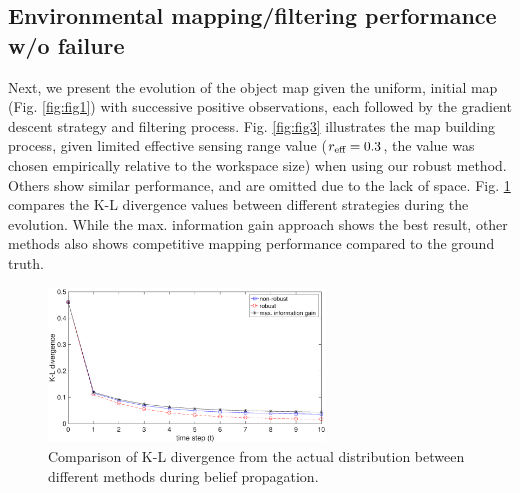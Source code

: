 \documentclass[letterpaper, 10 pt, conference]{ieeeconf}
\begin{document}
\subsection{Environmental mapping/filtering performance w/o failure}
Next, we present the evolution of the object map given the uniform, initial map (Fig. \ref{fig:fig1}) with successive positive observations, each followed by the gradient descent strategy and filtering process. Fig. \ref{fig:fig3} illustrates the map building process, given limited effective sensing range value ($r_{\textup{eff}}=0.3$, the value was chosen empirically relative to the workspace size) when using our robust method. Others show similar performance, and are omitted due to the lack of space.
%
%
Fig. \ref{fig:fig5} compares the K-L divergence values between different strategies during the evolution. While the max. information gain approach shows the best result, other methods also shows competitive mapping performance compared to the ground truth.
\begin{figure}
	\centering
	\includegraphics[width=2.9in]{figure/cost_comp0}
	\caption{Comparison of K-L divergence from the actual distribution between different methods during belief propagation.}
	\label{fig:fig5}
\end{figure}
\end{document}
